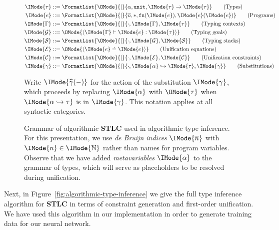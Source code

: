 \documentclass[twocolumn,9pt]{article}
\theoremstyle{definition}
\theoremstyle{remark}
\numberwithin{equation}{section}
\newcommand\Nat{\mathbb{N}}
\newcommand\Member[2]{\IMode{#1}\in\IMode{#2}}
\newcommand\STLC{\textbf{STLC}}
\newcommand\Nil{*}
\newcommand\DBFn[1]{\mathtt{fn} (#1)}
\newcommand\TyUnit{\mathtt{unit}}
\newcommand\TyArr[2]{#1\to{#2}}
\newcommand\Var[1]{\overline{#1}}
\newcommand\MkGoal[3]{\langle{#1}\vdash{#2}:{#3}\rangle}
\newcommand\MkEq[2]{\langle{#1}\doteq{#2}\rangle}
\newcommand\Subst[2]{\widehat{#1} (#2)}
\begin{document}
\begin{figure*}
  \begin{align*}
    \IMode{\tau} &::= \FormatList{\OMode}{\mid}{\alpha, \TyUnit,\TyArr{\IMode{\tau}}{\IMode{\tau}}}
    \tag{Types}
    \\
    \IMode{e} &::= \FormatList{\OMode}{\mid}{\Var{n}, \Nil, \DBFn{\IMode{e}}, \IMode{e}(\IMode{e})}
    \tag{Programs}
    \\
    \IMode{\Gamma} &::= \FormatList{\OMode}{\mid}{\cdot,{\IMode{\Gamma},\IMode{\tau}}}
    \tag{Typing contexts}
    \\
    \IMode{\mathcal{G}} &::= \OMode{\MkGoal{\IMode{\Gamma}}{\IMode{e}}{\IMode{\tau}}}
    \tag{Typing goals}
    \\
    \IMode{\mathcal{S}} &::= \FormatList{\OMode}{\mid}{\cdot, {\IMode{\mathcal{G}},\IMode{\mathcal{S}}}}
    \tag{Typing stacks}
    \\
    \IMode{\mathcal{E}} &::= \OMode{\MkEq{\IMode{e}}{\IMode{e}}}
    \tag{Unification equations}
    \\
    \IMode{\mathcal{C}} &::= \FormatList{\OMode}{\mid}{\cdot,{\IMode{\mathcal{E}},\IMode{\mathcal{C}}}}
    \tag{Unification constraints}
    \\
    \IMode{\gamma} &::= \FormatList{\OMode}{\mid}{\cdot, {\IMode{\alpha}\hookrightarrow\IMode{\tau},\IMode{\gamma}}}
    \tag{Substitutions}
  \end{align*}

  Write $\IMode{\Subst{\gamma}{-}}$ for the action of the substitution
  $\IMode{\gamma}$, which proceeds by replacing $\IMode{\alpha}$ with
  $\OMode{\tau}$ when $\IMode{\alpha\hookrightarrow\tau}$ is in
  $\IMode{\gamma}$. This notation applies at all syntactic categories.

  \caption{Grammar of algorithmic \STLC{} used in algorithmic type
    inference.  For this presentation, we use \emph{de Bruijn indices}
    $\IMode{\Var{n}}$ with $\Member{n}{\Nat}$ rather than names for
    program variables. Observe that we have added \emph{metavariables}
    $\IMode{\alpha}$ to the grammar of types, which will serve as
    placeholders to be resolved during unification.
  }\label{fig:stlc-algorithmic-grammar}
\end{figure*}

Next, in Figure~\ref{fig:algorithmic-type-inference} we give the full
type inference algorithm for \STLC{} in terms of constraint generation
and first-order unification. We have used this algorithm in our
implementation in order to generate training data for our neural
network.
\end{document}
